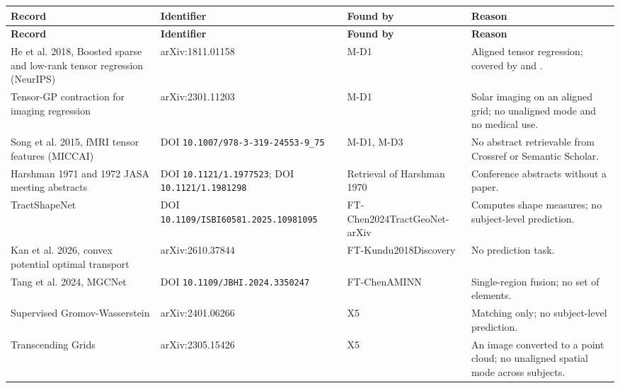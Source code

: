 \documentclass[journal,onecolumn]{IEEEtran}
\begin{document}
{\footnotesize
\setlength{\tabcolsep}{3pt}
\begin{longtable}{@{}>{\raggedright\arraybackslash\hspace{0pt}}p{}>{\raggedright\arraybackslash\hspace{0pt}}p{}>{\raggedright\arraybackslash\hspace{0pt}}p{}>{\raggedright\arraybackslash\hspace{0pt}}p{}@{}}
\toprule
\textbf{Record} & \textbf{Identifier} & \textbf{Found by} & \textbf{Reason} \\
\midrule
\endfirsthead
\toprule
\textbf{Record} & \textbf{Identifier} & \textbf{Found by} & \textbf{Reason} \\
\midrule
\endhead
\bottomrule
\endlastfoot
He et al. 2018,\allowbreak{} Boosted sparse and low-rank tensor regression (NeurIPS) & arXiv:\allowbreak{}1811.01158 & M-D1 & Aligned tensor regression; covered by \cite{Zhou2013Tensor} and \cite{Guhaniyogi2017Bayesian}. \\
Tensor-GP contraction for imaging regression & arXiv:\allowbreak{}2301.11203 & M-D1 & Solar imaging on an aligned grid; no unaligned mode and no medical use. \\
Song et al. 2015,\allowbreak{} fMRI tensor features (MICCAI) & DOI \nolinkurl{10.1007/978-3-319-24553-9_75} & M-D1,\allowbreak{} M-D3 & No abstract retrievable from Crossref or Semantic Scholar. \\
Harshman 1971 and 1972 JASA meeting abstracts & DOI \nolinkurl{10.1121/1.1977523}; DOI \nolinkurl{10.1121/1.1981298} & Retrieval of Harshman 1970 & Conference abstracts without a paper. \\
TractShapeNet & DOI \nolinkurl{10.1109/ISBI60581.2025.10981095} & FT-Chen2024TractGeoNet-arXiv & Computes shape measures; no subject-level prediction. \\
Kan et al. 2026,\allowbreak{} convex potential optimal transport & arXiv:\allowbreak{}2610.37844 & FT-Kundu2018Discovery & No prediction task. \\
Tang et al. 2024,\allowbreak{} MGCNet & DOI \nolinkurl{10.1109/JBHI.2024.3350247} & FT-ChenAMINN & Single-region fusion; no set of elements. \\
Supervised Gromov-Wasserstein & arXiv:\allowbreak{}2401.06266 & X5 & Matching only; no subject-level prediction. \\
Transcending Grids & arXiv:\allowbreak{}2305.15426 & X5 & An image converted to a point cloud; no unaligned spatial mode across subjects. \\

\end{longtable}}
\end{document}
